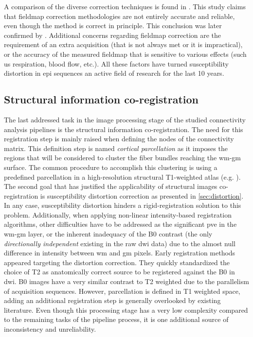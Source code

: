 A comparison of the diverse correction techniques is found in \citep{wu_comparison_2008}.
This study claims that fieldmap correction methodologies are not entirely accurate
and reliable, even though the method is correct in principle. This conclusion
was later confirmed by \citep{tao_variational_2009}. Additional concerns regarding
fieldmap correction are the requirement of an extra acquisition (that is not always
met or it is impractical), or the accuracy of the measured fieldmap that is sensitive
to various effects (such us respiration, blood flow, etc.). All these factors 
have turned susceptibility distortion in \gls{epi} sequences an active field of 
research for the last 10 years.


\subsection{Structural information co-registration}
\label{sec:registration}

The last addressed task in the image processing stage of the studied 
connectivity analysis pipelines is the structural information co-registration.
The need for this registration step is mainly raised when defining the 
nodes of the connectivity matrix. This definition step is named
\textit{cortical parcellation} as it imposes the regions that will be
considered to cluster the fiber bundles reaching the \gls{wm}-\gls{gm}
surface. The common procedure to accomplish this clustering is using
a predefined parcellation in a high-resolution structural T1-weighted 
atlas (e.g. \citep{greve_accurate_2009}). The second goal that has 
justified the applicability of structural
images co-registration is susceptibility distortion correction
as presented in \autoref{sec:distortion}. In any case, susceptibility 
distortion hinders a rigid-registration solution to this problem.
Additionally, when applying non-linear intensity-based
registration algorithms, other difficulties have to be addressed as
the significant \gls{pve} in the \gls{wm}-\gls{gm} layer, or the
inherent inadequacy of the B0 contrast (the only \textit{directionally
independent} existing in the raw \gls{dwi} data) due to the almost null
difference in intensity between \gls{wm} and \gls{gm} pixels. Early 
registration methods appeared targeting the distortion correction.
They quickly standardized the choice of T2 as anatomically correct source
to be registered against the B0 in \gls{dwi}. B0 images have a very similar
contrast to T2 weighted due to the parallelism of acquisition sequences.
However, parcellation is defined in T1 weighted space, adding an additional 
registration step is generally overlooked by existing literature. Even though this
processing stage has a very low complexity compared to the remaining tasks of 
the pipeline process, it is one additional source of inconsistency
and unreliability.


